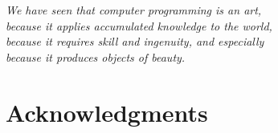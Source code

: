 
\begin{flushright}{\slshape
    We have seen that computer programming is an art, \\
    because it applies accumulated knowledge to the world, \\
    because it requires skill and ingenuity, and especially \\
    because it produces objects of beauty.} \\ \medskip
\end{flushright}



\bigskip

\begingroup
\let\clearpage\relax
\let\cleardoublepage\relax
\let\cleardoublepage\relax
\chapter*{Acknowledgments}






\endgroup
